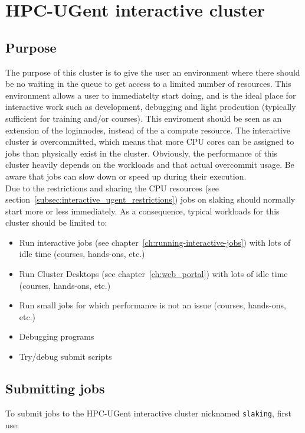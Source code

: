 \chapter{HPC-UGent interactive cluster}
\label{ch:interactive_ugent}


\section{Purpose}
\label{sec:interactive_ugent_pupose}
The purpose of this cluster is to give the user an environment where
there should be no waiting in the queue to get access to a limited
number of resources. This environment allows a user to immediatelty
start doing, and is the ideal place for interactive work such as
development, debugging and light prodcution (typically sufficient
for training and/or courses). This enviroment should be seen as an
extension of the loginnodes, instead of the a compute resource.
The interactive cluster is overcommitted, which means that more CPU cores can be
assigned to jobs than physically exist in the cluster. Obviously, the performance of this cluster
heavily depends on the workloads and that actual overcommit usage. Be aware that jobs can slow
down or speed up during their execution.
\\ Due to the restrictions and sharing the CPU resources (see section~\ref{subsec:interactive_ugent_restrictions}) 
jobs on slaking should normally start more or less immediately. As a consequence,
typical workloads for this cluster should be limited to:
\begin{itemize}
  \item  Run interactive jobs (see chapter~\ref{ch:running-interactive-jobs}) with lots of idle time
         (courses, hands-ons, etc.) 
  \item  Run Cluster Desktops (see chapter~\ref{ch:web_portal}) with lots of idle time
         (courses, hands-ons, etc.)
  \item  Run small jobs for which performance is not an issue (courses, hands-ons, etc.)
  \item  Debugging programs
  \item  Try/debug submit scripts
\end{itemize} 

\section{Submitting jobs}
\label{sec:interactive_ugent_jobs}

To submit jobs to the HPC-UGent interactive cluster nicknamed \lstinline|slaking|, first use:


